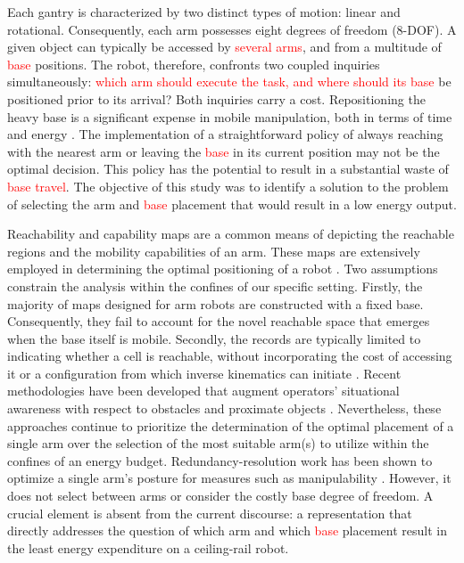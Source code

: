 \documentclass[conference]{IEEEtran}
\begin{document}
Each gantry is characterized by two distinct types of motion: linear and rotational. 
Consequently, each arm possesses eight degrees of freedom (8-DOF).
A given object can typically be accessed by \textcolor{red}{several arms}, and from a multitude of
\textcolor{red}{base} positions. 
The robot, therefore, confronts two coupled inquiries simultaneously: 
\textcolor{red}{which arm should execute the task, and where should its base}
be positioned prior to its arrival? Both inquiries carry a cost. 
Repositioning the heavy base is a significant expense in mobile manipulation, 
both in terms of time and energy \cite{MoMaPos2024,BaSeNet2024,EnergySLR2024}. 
The implementation of a straightforward policy of always reaching with 
the nearest arm or leaving the \textcolor{red}{base} in its current position may not be the optimal decision.
This policy has the potential to result in a substantial waste of \textcolor{red}{base travel}. 
The objective of this study was to identify a solution to the problem of 
selecting the arm and \textcolor{red}{base} placement that would result in a low energy output.

Reachability and capability maps are a common means of depicting the reachable 
regions and the mobility capabilities of an arm. These maps are extensively 
employed in determining the optimal positioning of a robot \cite{Zacharias2007,Makhal2018}. 
Two assumptions constrain the analysis within the confines of our specific setting. 
Firstly, the majority of maps designed for arm robots are constructed with a fixed base. 
Consequently, they fail to account for the novel reachable space that emerges when the base 
itself is mobile. Secondly, the records are typically limited to indicating 
whether a cell is reachable, without incorporating the cost of accessing it 
or a configuration from which inverse kinematics can initiate \cite{Zacharias2007}. 
Recent methodologies have been developed that augment operators' situational awareness 
with respect to obstacles and proximate objects
\cite{MoMaPos2024,InvReach2022}. Nevertheless, these approaches continue to 
prioritize the determination of the optimal placement of a single arm over 
the selection of the most suitable arm(s) to utilize within the confines 
of an energy budget.
Redundancy-resolution work has been shown to optimize a single arm's 
posture for measures such as manipulability \cite{Yoshikawa1985}. 
However, it does not select between arms or consider the costly base degree of freedom. 
A crucial element is absent from the current discourse: a representation that 
directly addresses the question of which arm and which \textcolor{red}{base} placement result
in the least energy expenditure on a ceiling-rail robot.
\end{document}
